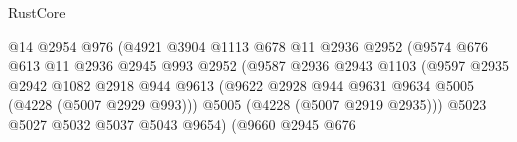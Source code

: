 \begin{lexlean}{RustCore}
\begin{coremodule}
                                            @14
                                            @2954
                                            @976
                                            (@4921
                                              @3904
                                              @1113
                                              @678
                                              @11
                                              @2936
                                              @2952
                                              (@9574
                                                @676
                                                @613
                                                @11
                                                @2936
                                                @2945
                                                @993
                                                @2952
                                                (@9587
                                                  @2936
                                                  @2943
                                                  @1103
                                                  (@9597
                                                    @2935
                                                    @2942
                                                    @1082
                                                    @2918
                                                    @944
                                                    @9613
                                                    (@9622
                                                      @2928
                                                      @944
                                                      @9631
                                                      @9634
                                                      @5005
                                                      (@4228 (@5007 @2929 @993)))
                                                    @5005
                                                    (@4228 (@5007 @2919 @2935)))
                                                  @5023
                                                  @5027
                                                  @5032
                                                  @5037
                                                  @5043
                                                  @9654)
                                                (@9660
                                                  @2945
                                                  @676

\end{coremodule}
\end{lexlean}
